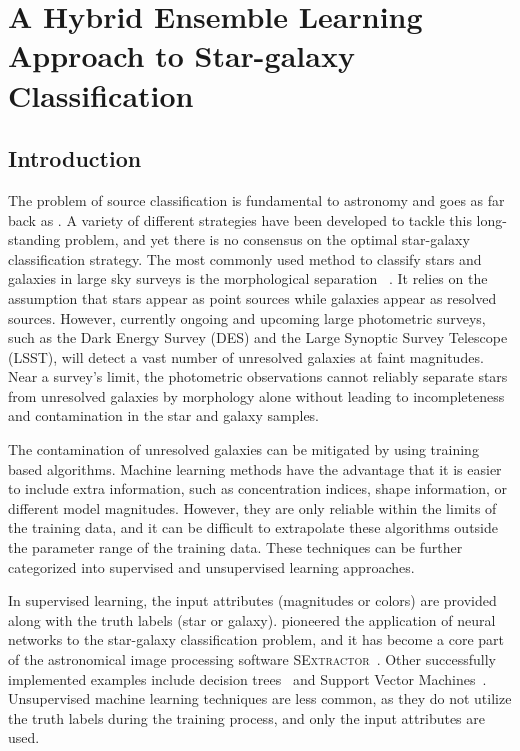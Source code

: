 \chapter{A Hybrid Ensemble Learning Approach to Star-galaxy Classification}
  \label{chapter2}

\section{Introduction}
  \label{section:introduction}

The problem of source classification is fundamental to astronomy
and goes as far back as \citet{messier1781catalogue}.
A variety of different strategies have been developed 
to tackle this long-standing problem,
and yet there is no consensus on
the optimal star-galaxy classification strategy.
The most commonly used method to classify stars and galaxies
in large sky surveys is the morphological separation
~\citep{sebok1979optimal, kron1980photometry, valdes1982resolution,
yee1991faint, vasconcellos2011decision,
henrion2011bayesian}.
It relies on the assumption that
stars appear as point sources
while galaxies appear as resolved sources.
However,
currently ongoing and upcoming large photometric surveys,
such as the Dark Energy Survey (DES) and the Large Synoptic Survey Telescope (LSST),
will detect a vast number of unresolved galaxies at faint magnitudes.
Near a survey's limit, the photometric observations
cannot reliably separate stars from unresolved galaxies
by morphology alone without leading to
incompleteness and contamination in the star and galaxy samples.

The contamination of unresolved galaxies can be mitigated
by using training based algorithms.
Machine learning methods have the advantage that
it is easier to include extra information,
such as concentration indices, shape information,
or different model magnitudes.
However,
they are only reliable within the limits of the training data,
and it can be difficult to extrapolate these algorithms
outside the parameter range of the training data.
These techniques can be further categorized into
supervised and unsupervised learning approaches.

In supervised learning, 
the input attributes (\eg magnitudes or colors)
are provided along with the truth labels (\eg star or galaxy).
\citet{odewahn1992automated} pioneered
the application of neural networks
to the star-galaxy classification problem,
and it has become a core part of
the astronomical image processing software
\textsc{SExtractor}~\citep{bertin1996sextractor}.
Other successfully implemented examples include
decision trees~\citep{weir1995automated, suchkov2005census, ball2006robust,
sevilla2015effect}
and Support Vector Machines~\citep*{Fadely2012}.
Unsupervised machine learning techniques
are less common,
as they do not utilize the truth labels during the training process,
and only the input attributes are used.

